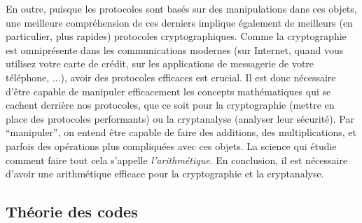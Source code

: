En outre, puisque les protocoles sont basés sur des manipulations dans ces
objets, une meilleure compréhension de ces derniers implique également de
meilleurs (en particulier, plus rapides) protocoles cryptographiques. Comme la
cryptographie est omniprésente dans les communications modernes (sur Internet,
quand vous utilisez votre carte de crédit, sur les applications de messagerie de
votre téléphone, ...), avoir des protocoles efficaces est crucial. Il est donc
nécessaire d'être capable de manipuler efficacement les concepts mathématiques
qui se cachent derrière nos protocoles, que ce soit pour la cryptographie
(mettre en place des protocoles performants) ou la cryptanalyse (analyser leur
sécurité). Par ``manipuler'', on entend être capable de faire des additions, des
multiplications, et parfois des opérations plus compliquées avec ces objets. La
science qui étudie comment faire tout cela s'appelle \emph{l'arithmétique}. En
conclusion, il est nécessaire d'avoir une arithmétique efficace pour la
cryptographie et la cryptanalyse.

\subsection*{Théorie des codes}
\label{sec:coding}

